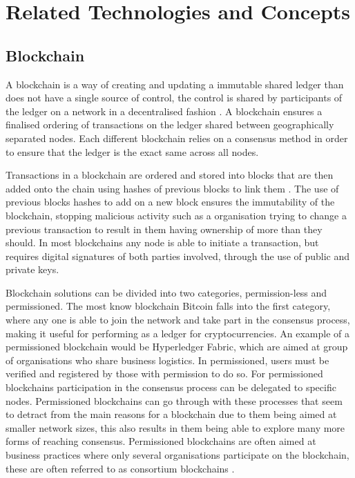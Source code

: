 \chapter{Related Technologies and Concepts}\label{ch:related-technologies-and-concepts}

\section{Blockchain}

A blockchain is a way of creating and updating a immutable shared ledger than does not have a single source of control, the control is shared by participants of the ledger on a network in a decentralised fashion \cite{Baliga2017UnderstandingBC}. A blockchain ensures a finalised ordering of transactions on the ledger shared between geographically separated nodes. Each different blockchain relies on a consensus method in order to ensure that the ledger is the exact same across all nodes. 

Transactions in a blockchain are ordered and stored into blocks that are then added onto the chain using hashes of previous blocks to link them \cite{SCIOT}. The use of previous blocks hashes to add on a new block ensures the immutability of the blockchain, stopping malicious activity such as a organisation trying to change a previous transaction to result in them having ownership of more than they should. In most blockchains any node is able to initiate a transaction, but requires digital signatures of both parties involved, through the use of public and private keys. 

Blockchain solutions can be divided into two categories, permission-less and permissioned. The most know blockchain Bitcoin falls into the first category, where any one is able to join the network and take part in the consensus process, making it useful for performing as a ledger for cryptocurrencies. An example of a permissioned blockchain would be Hyperledger Fabric, which are aimed at group of organisations who share business logistics. In permissioned, users must be verified and registered by those with permission to do so. For permissioned blockchains participation in the consensus process can be delegated to specific nodes. Permissioned blockchains can go through with these processes that seem to detract from the main reasons for a blockchain due to them being aimed at smaller network sizes, this also results in them being able to explore many more forms of reaching consensus. Permissioned blockchains are often aimed at business practices where only several organisations participate on the blockchain, these are often referred to as consortium blockchains \cite{BCforIoT}.


